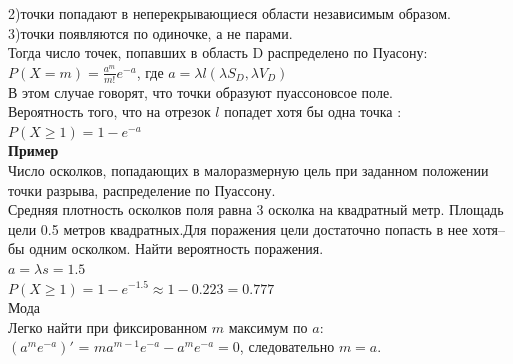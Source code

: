 \documentclass[russian, 12pt, fleqn]{article}
\begin{document}
2)точки попадают в неперекрывающиеся области независимым образом.\\
3)точки появляются по одиночке, а не парами.\\
Тогда число точек, попавших в область D распределено по Пуасону: \\$P(X=m) = \frac{a^m}{m!}e^{-a}$, где $a=\lambda l(\lambda S_D, \lambda V_D)$\\
В этом случае говорят, что точки образуют пуассоновсое поле.\\
Вероятность того, что на отрезок $l$ попадет хотя бы одна точка :\\ $P(X\geq1) = 1 - e^{-a}$\\
\textbf{Пример} \\
Число осколков, попадающих в малоразмерную цель при заданном положении точки разрыва, распределение по Пуассону.\\
Средняя плотность осколков поля равна 3 осколка на квадратный метр. Площадь цели 0.5 метров квадратных.Для поражения цели достаточно попасть в нее хотя--бы одним осколком. Найти вероятность поражения.\\
$a=\lambda s =1.5$\\
$P(X\geq1)=1 - e^{-1.5} \approx 1 - 0.223 = 0.777$\\
Мода\\
Легко найти при фиксированном $m$ максимум по $a$:\\
$(a^me^{-a})'$ = $ma^{m-1}e^{-a} - a^me^{-a} = 0$, следовательно $m = a$.
\end{document}
